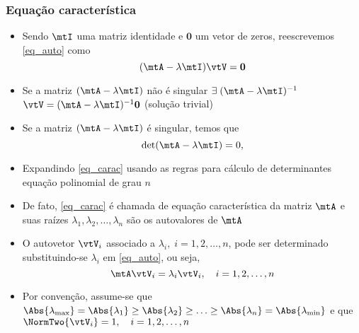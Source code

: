 \begin{frame}
  \frametitle{Equação característica}
  \begin{itemize}\small
    \item Sendo $\mtI$ uma matriz identidade e $\mathbf{0}$ um vetor de zeros, reescrevemos \eqref{eq_auto} como
    \begin{equation}
      (\mtA - \lambda\mtI)\vtV = \mathbf{0}
    \end{equation}
    \item Se a matriz $(\mtA - \lambda\mtI)$ não é singular  $\exists \; (\mtA - \lambda\mtI)^{-1}$   $\vtV = (\mtA - \lambda\mtI)^{-1}\mathbf{0}$ (solução trivial)
    \item Se a matriz $(\mtA - \lambda\mtI)$ é singular, temos que
    \begin{equation}\label{eq_carac}
      \det(\mtA - \lambda\mtI) = 0,
    \end{equation}
    \item Expandindo \eqref{eq_carac} usando as regras para cálculo de determinantes  equação polinomial de grau $n$
    \item De fato, \eqref{eq_carac} é chamada de {\alert{equação característica}} da matriz $\mtA$ e suas raízes $\lambda_1, \lambda_2, \ldots, \lambda_n$ são os \alert{autovalores} de $\mtA$
    \item O autovetor $\vtV_i$ associado a $\lambda_i, \; i = 1, 2, \ldots, n$, pode ser determinado substituindo-se $\lambda_i$ em \eqref{eq_auto}, ou seja,
    \begin{equation}\label{eq_lambda}
      \mtA\vtV_i = \lambda_i\vtV_i, \quad i = 1, 2, \ldots, n
    \end{equation}
    \item Por convenção, assume-se que $\Abs{\lambda_{\max}} = \Abs{\lambda_1} \geq \Abs{\lambda_2} \geq \ldots \geq \Abs{\lambda_n} = \Abs{\lambda_{\min}}$ e que $\NormTwo{\vtV_i} = 1, \quad i = 1, 2, \ldots, n$
  \end{itemize}
\end{frame}

